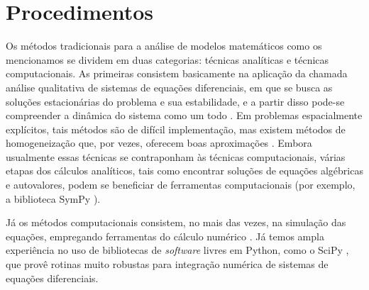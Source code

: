 \documentclass[12pt]{extarticle}
\begin{document}
\section{Procedimentos}
Os métodos tradicionais para a análise de modelos matemáticos como os mencionamos 
se dividem em duas categorias: técnicas
analíticas e técnicas computacionais. As primeiras consistem basicamente na
aplicação da chamada análise qualitativa de sistemas de equações diferenciais,
em que se busca as soluções estacionárias do problema e sua estabilidade, e a
partir disso pode-se compreender a dinâmica do sistema como um todo
\citep{murray2002}. Em problemas espacialmente explícitos, tais métodos são de
difícil implementação, mas existem métodos de homogeneização que, por vezes,
oferecem boas aproximações \citep{cobbold2014}. Embora usualmente essas
técnicas se contraponham às técnicas computacionais, várias etapas dos
cálculos analíticos, tais como encontrar soluções de equações algébricas e
autovalores, podem se beneficiar de ferramentas computacionais (por exemplo, a
biblioteca SymPy \citep{sympy}).

Já os métodos computacionais consistem, no mais das vezes, na simulação das
equações, empregando ferramentas do cálculo numérico \citep{iserles2009}. Já
temos ampla experiência no uso de bibliotecas de \emph{software} livres em
Python, como o SciPy \citep{scipy}, que provê rotinas muito robustas para
integração numérica de sistemas de equações diferenciais.
\end{document}
